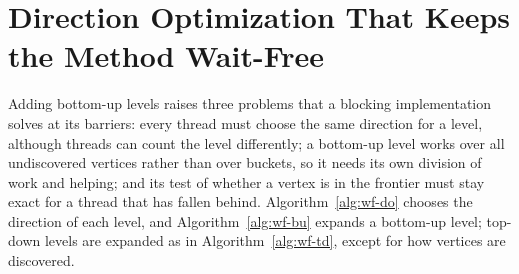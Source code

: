 \section{Direction Optimization That Keeps the Method Wait-Free}
\label{sec:dir-opt}

Adding bottom-up levels raises three problems that a blocking implementation solves at its barriers: every thread must choose the same direction for a level, although threads can count the level differently; a bottom-up level works over all undiscovered vertices rather than over buckets, so it needs its own division of work and helping; and its test of whether a vertex is in the frontier must stay exact for a thread that has fallen behind. Algorithm~\ref{alg:wf-do} chooses the direction of each level, and Algorithm~\ref{alg:wf-bu} expands a bottom-up level; top-down levels are expanded as in Algorithm~\ref{alg:wf-td}, except for how vertices are discovered.

